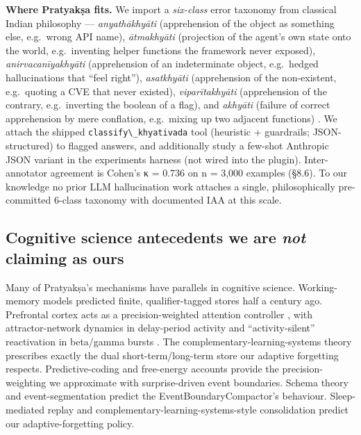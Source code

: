 \textbf{Where Pratyakṣa fits.} We import a \emph{six-class} error taxonomy from classical Indian philosophy --- \emph{anyathākhyāti} (apprehension of the object as something else, e.g.~wrong API name), \emph{ātmakhyāti} (projection of the agent's own state onto the world, e.g.~inventing helper functions the framework never exposed), \emph{anirvacanīyakhyāti} (apprehension of an indeterminate object, e.g.~hedged hallucinations that ``feel right''), \emph{asatkhyāti} (apprehension of the non-existent, e.g.~quoting a CVE that never existed), \emph{viparītakhyāti} (apprehension of the contrary, e.g.~inverting the boolean of a flag), and \emph{akhyāti} (failure of correct apprehension by mere conflation, e.g.~mixing up two adjacent functions) \citep{ram2007error, matilal1986perception, bilimoria2018epistemology}. We attach the shipped \passthrough{\lstinline!classify\_khyativada!} tool (heuristic + guardrails; JSON-structured) to flagged answers, and additionally study a few-shot Anthropic JSON variant in the experiments harness (not wired into the plugin). Inter-annotator agreement is Cohen's κ \citep{cohen1960kappa, landis1977kappa} = 0.736 on n = 3,000 examples (§8.6). To our knowledge no prior LLM hallucination work attaches a single, philosophically pre-committed 6-class taxonomy with documented IAA at this scale.

\subsection{\texorpdfstring{Cognitive science antecedents we are \emph{not} claiming as ours}{Cognitive science antecedents we are not claiming as ours}}\label{cognitive-science-antecedents-we-are-not-claiming-as-ours}

Many of Pratyakṣa's mechanisms have parallels in cognitive science. Working-memory models \citep{baddeley1974wm, baddeley2000episodic, cowan2001focus, miller1956magical} predicted finite, qualifier-tagged stores half a century ago. Prefrontal cortex acts as a precision-weighted attention controller \citep{miller2001integrative, corbetta2002dorsalventral, desimone1995biased, reynolds2009gain}, with attractor-network dynamics in delay-period activity \citep{compte2000attractor, funahashi1989delay} and ``activity-silent'' reactivation in beta/gamma bursts \citep{stokes2015activitysilent, lundqvist2016gamma}. The complementary-learning-systems theory \citep{mcclelland1995cls, kumaran2016cls} prescribes exactly the dual short-term/long-term store our adaptive forgetting respects. Predictive-coding and free-energy accounts \citep{rao1999predictive, friston2010fep, feldman2010precision} provide the precision-weighting we approximate with surprise-driven event boundaries. Schema theory \citep{bartlett1932remembering, ghosh2014schema, vankesteren2012slimm} and event-segmentation \citep{zacks2007event, baldassano2017nested} predict the EventBoundaryCompactor's behaviour. Sleep-mediated replay \citep{wilson1994replay, ambrose2016reward, diekelmann2010sleep, buzsaki2015ripples} and complementary-learning-systems-style consolidation \citep{richards2017persistence} predict our adaptive-forgetting policy.

